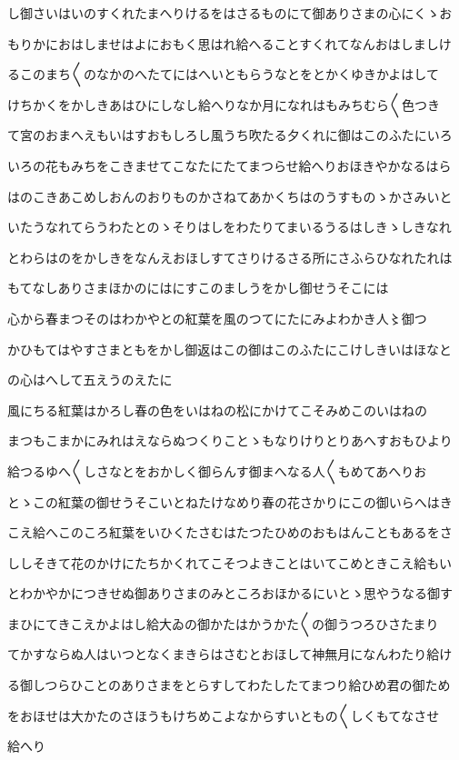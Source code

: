 \documentclass[a4paper,11pt,landscape]{ltjtarticle}
\begin{document}
\par\medskip
し御さいはいのすくれたまへりけるをはさるものにて御ありさまの心にくゝお
\par\medskip
もりかにおはしませはよにおもく思はれ給へることすくれてなんおはしましけ
\par\medskip
るこのまち〱のなかのへたてにはへいともらうなとをとかくゆきかよはして
\par\medskip
けちかくをかしきあはひにしなし給へりなか月になれはもみちむら〱色つき
\par\medskip
て宮のおまへえもいはすおもしろし風うち吹たる夕くれに御はこのふたにいろ
\par\medskip
いろの花もみちをこきませてこなたにたてまつらせ給へりおほきやかなるはら
\par\medskip
はのこきあこめしおんのおりものかさねてあかくちはのうすものゝかさみいと
\par\medskip
いたうなれてらうわたとのゝそりはしをわたりてまいるうるはしきゝしきなれ
\par\medskip
とわらはのをかしきをなんえおほしすてさりけるさる所にさふらひなれたれは
\par\medskip
もてなしありさまほかのにはにすこのましうをかし御せうそこには
\par\medskip
心から春まつそのはわかやとの紅葉を風のつてにたにみよわかき人〻御つ
\par\medskip
かひもてはやすさまともをかし御返はこの御はこのふたにこけしきいはほなと
\par\medskip
の心はへして五えうのえたに
\par\medskip
風にちる紅葉はかろし春の色をいはねの松にかけてこそみめこのいはねの
\par\medskip
まつもこまかにみれはえならぬつくりことゝもなりけりとりあへすおもひより
\par\medskip
給つるゆへ〱しさなとをおかしく御らんす御まへなる人〱もめてあへりお
\par\medskip
とゝこの紅葉の御せうそこいとねたけなめり春の花さかりにこの御いらへはき
\par\medskip
こえ給へこのころ紅葉をいひくたさむはたつたひめのおもはんこともあるをさ
\par\medskip
ししそきて花のかけにたちかくれてこそつよきことはいてこめときこえ給もい
\par\medskip
とわかやかにつきせぬ御ありさまのみところおほかるにいとゝ思やうなる御す
\par\medskip
まひにてきこえかよはし給大ゐの御かたはかうかた〱の御うつろひさたまり
\par\medskip
てかすならぬ人はいつとなくまきらはさむとおほして神無月になんわたり給け
\par\medskip
る御しつらひことのありさまをとらすしてわたしたてまつり給ひめ君の御ため
\par\medskip
をおほせは大かたのさほうもけちめこよなからすいともの〱しくもてなさせ
\par\medskip
給へり
\par\medskip
\end{document}
